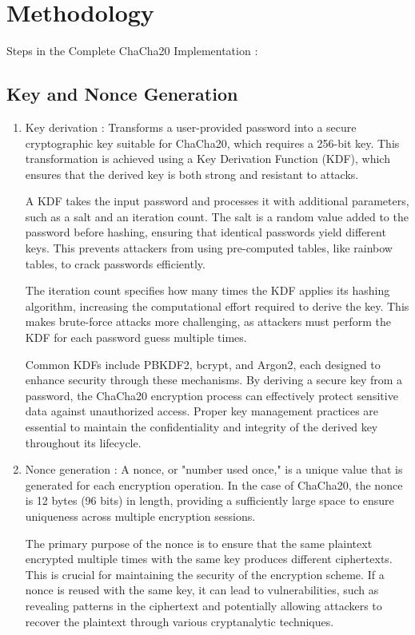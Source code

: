 \documentclass[a4paper,12pt]{report}
\begin{document}
\chapter{Methodology}

Steps in the Complete ChaCha20 Implementation :

\section{Key and Nonce Generation}
\begin{enumerate}
    \item Key derivation : Transforms a user-provided password into a secure cryptographic key suitable for ChaCha20, which requires a 256-bit key.
    This transformation is achieved using a Key Derivation Function (KDF), which ensures that the derived key is both strong and resistant to attacks.

    A KDF takes the input password and processes it with additional parameters, such as a salt and an iteration count.
    The salt is a random value added to the password before hashing, ensuring that identical passwords yield different keys.
    This prevents attackers from using pre-computed tables, like rainbow tables, to crack passwords efficiently.

    The iteration count specifies how many times the KDF applies its hashing algorithm, increasing the computational effort required to derive the key.
    This makes brute-force attacks more challenging, as attackers must perform the KDF for each password guess multiple times.

    Common KDFs include PBKDF2, bcrypt, and Argon2, each designed to enhance security through these mechanisms.
    By deriving a secure key from a password, the ChaCha20 encryption process can effectively protect sensitive data against unauthorized access.
    Proper key management practices are essential to maintain the confidentiality and integrity of the derived key throughout its lifecycle.
    \item Nonce generation : A nonce, or "number used once," is a unique value that is generated for each encryption operation.
    In the case of ChaCha20, the nonce is 12 bytes (96 bits) in length, providing a sufficiently large space to ensure uniqueness across multiple encryption sessions.

    The primary purpose of the nonce is to ensure that the same plaintext encrypted multiple times with the same key produces different ciphertexts.
    This is crucial for maintaining the security of the encryption scheme.
    If a nonce is reused with the same key, it can lead to vulnerabilities, such as revealing patterns in the ciphertext and potentially allowing attackers to recover the plaintext through various cryptanalytic techniques.


\end{enumerate}
\end{document}
